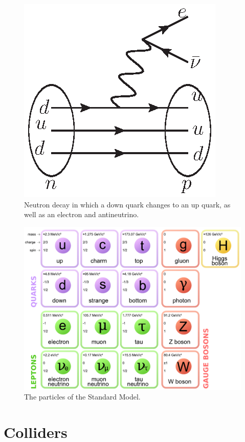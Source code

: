     \begin{figure}[!htbp]
    \centering
    \includegraphics[width=.4\textwidth]{figures/NeutronDecay.eps}
    \caption[
        The particles of the Standard Model.
    ]{
Neutron decay in which a down quark changes to an up quark, as well as an electron and antineutrino.
    }
    \label{fig:NeutronDecay}
\end{figure}
 

 
 


  
 
 
 \begin{figure}[!htbp]
    \centering
    \includegraphics[width=\textwidth]{figures/standard_model.pdf}
    \caption[
        The particles of the Standard Model.
    ]{
      The particles of the Standard Model.
    }
    \label{fig:ParticleTable}
\end{figure}
 
\section{Colliders}


